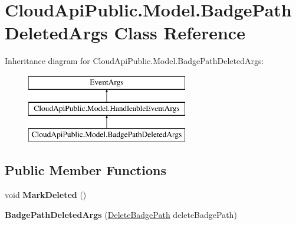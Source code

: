 \hypertarget{class_cloud_api_public_1_1_model_1_1_badge_path_deleted_args}{\section{Cloud\-Api\-Public.\-Model.\-Badge\-Path\-Deleted\-Args Class Reference}
\label{class_cloud_api_public_1_1_model_1_1_badge_path_deleted_args}
}
Inheritance diagram for Cloud\-Api\-Public.\-Model.\-Badge\-Path\-Deleted\-Args\-:\begin{figure}[H]
\begin{center}
\leavevmode
\includegraphics[height=3.000000cm]{class_cloud_api_public_1_1_model_1_1_badge_path_deleted_args}
\end{center}
\end{figure}
\subsection*{Public Member Functions}
\begin{DoxyCompactItemize}
\item 
\hypertarget{class_cloud_api_public_1_1_model_1_1_badge_path_deleted_args_a42abda00ff50ef590fac4eb0fb2d7754}{void {\bfseries Mark\-Deleted} ()}\label{class_cloud_api_public_1_1_model_1_1_badge_path_deleted_args_a42abda00ff50ef590fac4eb0fb2d7754}

\item 
\hypertarget{class_cloud_api_public_1_1_model_1_1_badge_path_deleted_args_a7b340f5b1fd89b7e3f9e0cce9fabebb7}{{\bfseries Badge\-Path\-Deleted\-Args} (\hyperlink{struct_cloud_api_public_1_1_model_1_1_delete_badge_path}{Delete\-Badge\-Path} delete\-Badge\-Path)}\label{class_cloud_api_public_1_1_model_1_1_badge_path_deleted_args_a7b340f5b1fd89b7e3f9e0cce9fabebb7}

\end{DoxyCompactItemize}
